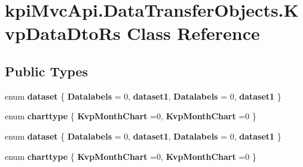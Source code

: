 \hypertarget{classkpi_mvc_api_1_1_data_transfer_objects_1_1_kvp_data_dto_rs}{}\section{kpi\+Mvc\+Api.\+Data\+Transfer\+Objects.\+Kvp\+Data\+Dto\+Rs Class Reference}
\label{classkpi_mvc_api_1_1_data_transfer_objects_1_1_kvp_data_dto_rs}
\subsection*{Public Types}
\begin{DoxyCompactItemize}
\item 
\mbox{\label{classkpi_mvc_api_1_1_data_transfer_objects_1_1_kvp_data_dto_rs_aec5ef29d115053aa1f78d15adc7e1373}} 
enum {\bfseries dataset} \{ {\bfseries Datalabels} = 0, 
{\bfseries dataset1}, 
{\bfseries Datalabels} = 0, 
{\bfseries dataset1}
 \}
\item 
\mbox{\label{classkpi_mvc_api_1_1_data_transfer_objects_1_1_kvp_data_dto_rs_a829c595d537885ae923de884be501246}} 
enum {\bfseries charttype} \{ {\bfseries Kvp\+Month\+Chart} =0, 
{\bfseries Kvp\+Month\+Chart} =0
 \}
\item 
\mbox{\label{classkpi_mvc_api_1_1_data_transfer_objects_1_1_kvp_data_dto_rs_aec5ef29d115053aa1f78d15adc7e1373}} 
enum {\bfseries dataset} \{ {\bfseries Datalabels} = 0, 
{\bfseries dataset1}, 
{\bfseries Datalabels} = 0, 
{\bfseries dataset1}
 \}
\item 
\mbox{\label{classkpi_mvc_api_1_1_data_transfer_objects_1_1_kvp_data_dto_rs_a829c595d537885ae923de884be501246}} 
enum {\bfseries charttype} \{ {\bfseries Kvp\+Month\+Chart} =0, 
{\bfseries Kvp\+Month\+Chart} =0
 \}
\end{DoxyCompactItemize}
